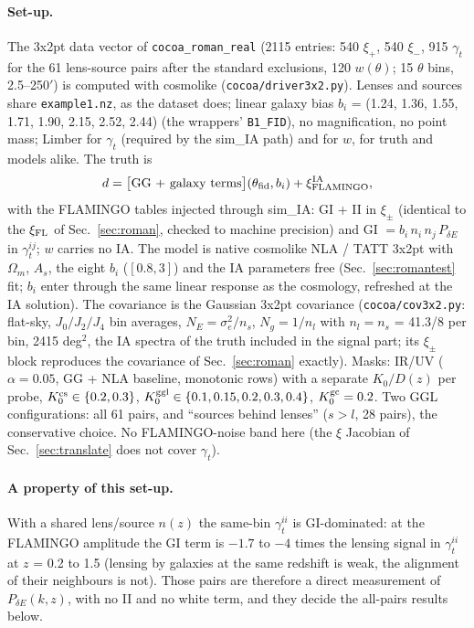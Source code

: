 \documentclass[11pt]{article}
\begin{document}
\paragraph{Set-up.} The 3x2pt data vector of \texttt{cocoa\_roman\_real} (2115 entries: 540 $\xi_+$, 540 $\xi_-$, 915 $\gamma_t$ for the 61 lens-source pairs after the standard exclusions, 120 $w(\theta)$; 15 $\theta$ bins, 2.5--250$'$) is computed with cosmolike (\texttt{cocoa/driver3x2.py}). Lenses and sources share \texttt{example1.nz}, as the dataset does; linear galaxy bias $b_i$ = (1.24, 1.36, 1.55, 1.71, 1.90, 2.15, 2.52, 2.44) (the wrappers' \texttt{B1\_FID}), no magnification, no point mass; Limber for $\gamma_t$ (required by the sim\_IA path) and for $w$, for truth and models alike. The truth is
\begin{equation}
d = \big[\text{GG + galaxy terms}\big](\theta_{\rm fid}, b_i) + \xi^{\rm IA}_{\rm FLAMINGO},
\end{equation}
with the FLAMINGO tables injected through sim\_IA: GI + II in $\xi_\pm$ (identical to the $\xi_{\rm FL}$ of Sec.~\ref{sec:roman}, checked to machine precision) and GI $= b_i\,n_i\,n_j\,P_{\delta E}$ in $\gamma_t^{ij}$; $w$ carries no IA. The model is native cosmolike NLA / TATT 3x2pt with $\Omega_m$, $A_s$, the eight $b_i$ ($[0.8, 3]$) and the IA parameters free (Sec.~\ref{sec:romantest} fit; $b_i$ enter through the same linear response as the cosmology, refreshed at the IA solution). The covariance is the Gaussian 3x2pt covariance (\texttt{cocoa/cov3x2.py}: flat-sky, $J_0/J_2/J_4$ bin averages, $N_E = \sigma_e^2/n_s$, $N_g = 1/n_l$ with $n_l = n_s$ = 41.3/8 per bin, 2415 deg$^2$, the IA spectra of the truth included in the signal part; its $\xi_\pm$ block reproduces the covariance of Sec.~\ref{sec:roman} exactly). Masks: IR/UV ($\alpha = 0.05$, GG + NLA baseline, monotonic rows) with a separate $K_0/D(z)$ per probe, $K_0^{\rm cs} \in \{0.2, 0.3\}$, $K_0^{\rm ggl} \in \{0.1, 0.15, 0.2, 0.3, 0.4\}$, $K_0^{\rm gc} = 0.2$. Two GGL configurations: all 61 pairs, and ``sources behind lenses'' ($s > l$, 28 pairs), the conservative choice. No FLAMINGO-noise band here (the $\xi$ Jacobian of Sec.~\ref{sec:translate} does not cover $\gamma_t$).

\paragraph{A property of this set-up.} With a shared lens/source $n(z)$ the same-bin $\gamma_t^{ii}$ is GI-dominated: at the FLAMINGO amplitude the GI term is $-1.7$ to $-4$ times the lensing signal in $\gamma_t^{ii}$ at $z$ = 0.2 to 1.5 (lensing by galaxies at the same redshift is weak, the alignment of their neighbours is not). Those pairs are therefore a direct measurement of $P_{\delta E}(k, z)$, with no II and no white term, and they decide the all-pairs results below.
\end{document}
